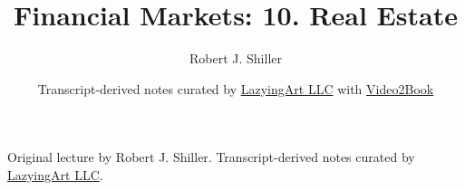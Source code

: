 \documentclass[11pt,oneside]{book}
\begin{document}
\frontmatter
\title{Financial Markets: 10. Real Estate}
\author{Robert J. Shiller}
\date{Transcript-derived notes curated by \href{https://lazying.art}{LazyingArt LLC} with \href{https://github.com/lachlanchen/Video2Book}{Video2Book}}
\maketitle
\begin{center}
\small Original lecture by Robert J. Shiller. Transcript-derived notes curated by \href{https://lazying.art}{LazyingArt LLC}.
\end{center}
\clearpage
\mainmatter

\end{document}
